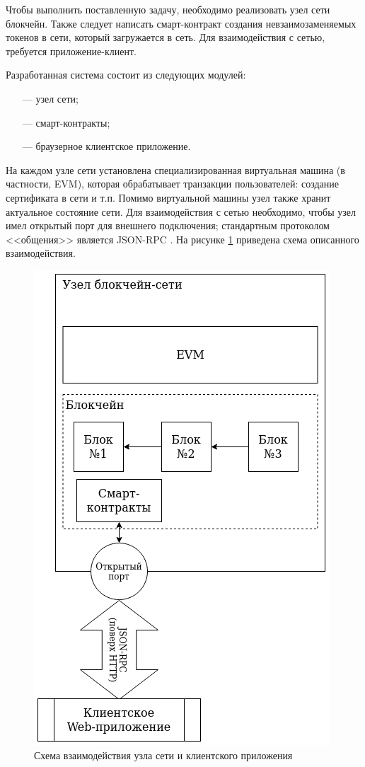 Чтобы выполнить поставленную задачу, необходимо реализовать узел сети блокчейн. Также следует написать смарт-контракт создания невзаимозаменяемых токенов в сети, который загружается в сеть. Для взаимодействия с сетью, требуется приложение-клиент.


Разработанная система состоит из следующих модулей:
\begin{itemize}[leftmargin=1.6\parindent]
	\item[---] узел сети;
	\item[---] смарт-контракты;
	\item[---] браузерное клиентское приложение.
\end{itemize}

На каждом узле сети установлена специализированная виртуальная машина (в частности, EVM), которая обрабатывает транзакции пользователей: создание сертификата в сети и т.п. Помимо виртуальной машины узел также хранит актуальное состояние сети. Для взаимодействия с сетью необходимо, чтобы узел имел открытый порт для внешнего подключения; стандартным протоколом <<общения>>  является JSON-RPC \cite{rpc}. На рисунке \ref{fig:a9} приведена схема описанного взаимодействия.


\begin{figure}[hbtp]
	\centering
	\includegraphics{img/node.png}
	\caption{Схема взаимодействия узла сети и клиентского приложения}
	\label{fig:a9}
\end{figure}



